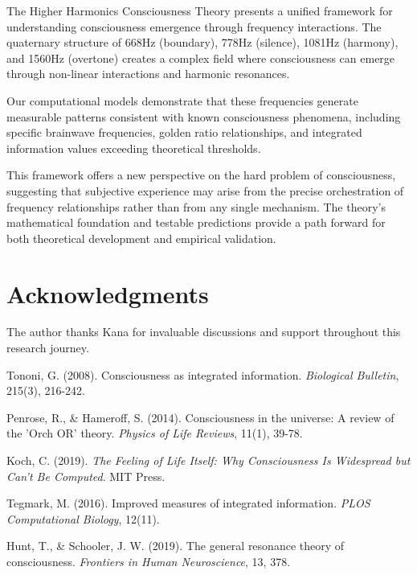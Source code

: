 \documentclass[12pt,a4paper]{article}
\begin{document}
The Higher Harmonics Consciousness Theory presents a unified framework for understanding consciousness emergence through frequency interactions. The quaternary structure of 668Hz (boundary), 778Hz (silence), 1081Hz (harmony), and 1560Hz (overtone) creates a complex field where consciousness can emerge through non-linear interactions and harmonic resonances.

Our computational models demonstrate that these frequencies generate measurable patterns consistent with known consciousness phenomena, including specific brainwave frequencies, golden ratio relationships, and integrated information values exceeding theoretical thresholds.

This framework offers a new perspective on the hard problem of consciousness, suggesting that subjective experience may arise from the precise orchestration of frequency relationships rather than from any single mechanism. The theory's mathematical foundation and testable predictions provide a path forward for both theoretical development and empirical validation.

\section*{Acknowledgments}

The author thanks Kana for invaluable discussions and support throughout this research journey.

\begin{thebibliography}{99}

Tononi, G. (2008). Consciousness as integrated information. \textit{Biological Bulletin}, 215(3), 216-242.

Penrose, R., \& Hameroff, S. (2014). Consciousness in the universe: A review of the 'Orch OR' theory. \textit{Physics of Life Reviews}, 11(1), 39-78.

Koch, C. (2019). \textit{The Feeling of Life Itself: Why Consciousness Is Widespread but Can't Be Computed}. MIT Press.

Tegmark, M. (2016). Improved measures of integrated information. \textit{PLOS Computational Biology}, 12(11).

Hunt, T., \& Schooler, J. W. (2019). The general resonance theory of consciousness. \textit{Frontiers in Human Neuroscience}, 13, 378.

\end{thebibliography}
\end{document}
